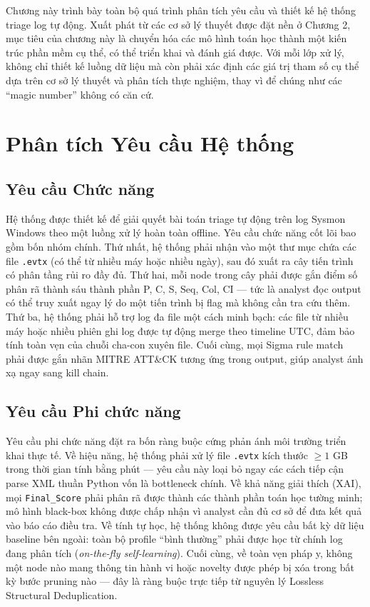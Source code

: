 \documentclass[../main.tex]{subfiles}
\begin{document}
Chương này trình bày toàn bộ quá trình phân tích yêu cầu và thiết kế hệ thống triage log tự động. Xuất phát từ các cơ sở lý thuyết được đặt nền ở Chương 2, mục tiêu của chương này là chuyển hóa các mô hình toán học thành một kiến trúc phần mềm cụ thể, có thể triển khai và đánh giá được. Với mỗi lớp xử lý, không chỉ thiết kế luồng dữ liệu mà còn phải xác định các giá trị tham số cụ thể dựa trên cơ sở lý thuyết và phân tích thực nghiệm, thay vì để chúng như các ``magic number'' không có căn cứ.

\section{Phân tích Yêu cầu Hệ thống}
\label{section:3.1}

\subsection{Yêu cầu Chức năng}
\label{subsection:3.1.1}

Hệ thống được thiết kế để giải quyết bài toán triage tự động trên log Sysmon Windows theo một luồng xử lý hoàn toàn offline. Yêu cầu chức năng cốt lõi bao gồm bốn nhóm chính. Thứ nhất, hệ thống phải nhận vào một thư mục chứa các file \texttt{.evtx} (có thể từ nhiều máy hoặc nhiều ngày), sau đó xuất ra cây tiến trình có phân tầng rủi ro đầy đủ. Thứ hai, mỗi node trong cây phải được gắn điểm số phân rã thành sáu thành phần P, C, S, Seq, Col, CI — tức là analyst đọc output có thể truy xuất ngay lý do một tiến trình bị flag mà không cần tra cứu thêm. Thứ ba, hệ thống phải hỗ trợ log đa file một cách minh bạch: các file từ nhiều máy hoặc nhiều phiên ghi log được tự động merge theo timeline UTC, đảm bảo tính toàn vẹn của chuỗi cha-con xuyên file. Cuối cùng, mọi Sigma rule match phải được gắn nhãn MITRE ATT\&CK tương ứng trong output, giúp analyst ánh xạ ngay sang kill chain.

\subsection{Yêu cầu Phi chức năng}
\label{subsection:3.1.2}

Yêu cầu phi chức năng đặt ra bốn ràng buộc cứng phản ánh môi trường triển khai thực tế. Về hiệu năng, hệ thống phải xử lý file \texttt{.evtx} kích thước $\ge 1$ GB trong thời gian tính bằng phút — yêu cầu này loại bỏ ngay các cách tiếp cận parse XML thuần Python vốn là bottleneck chính. Về khả năng giải thích (XAI), mọi \texttt{Final\_Score} phải phân rã được thành các thành phần toán học tường minh; mô hình black-box không được chấp nhận vì analyst cần đủ cơ sở để đưa kết quả vào báo cáo điều tra. Về tính tự học, hệ thống không được yêu cầu bất kỳ dữ liệu baseline bên ngoài: toàn bộ profile ``bình thường'' phải được học từ chính log đang phân tích (\textit{on-the-fly self-learning}). Cuối cùng, về toàn vẹn pháp y, không một node nào mang thông tin hành vi hoặc novelty được phép bị xóa trong bất kỳ bước pruning nào — đây là ràng buộc trực tiếp từ nguyên lý Lossless Structural Deduplication.
\end{document}
